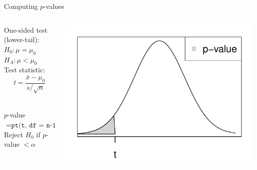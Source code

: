 \documentclass[fleqn, 10pt]{beamer}\usepackage[]{graphicx}\usepackage[]{color}
\begin{document}
\begin{frame}{Computing $p$-values}
\begin{columns}
\begin{column}{0.45\textwidth}
One-sided test (lower-tail):\\
$H_0: \mu = \mu_0$\\
$H_A: \mu < \mu_0$\\
\vspace{10pt}
Test statistic:\\
$$t = \frac{\bar{x} - \mu_0}{s/\sqrt{n}}$$\\
\vspace{10pt}

$p$-value $= \texttt{pt(t, df = n-1)}$\\ 
\vspace{10pt}
Reject $H_0$ if $p$-value $< \alpha$\\
\end{column}
\begin{column}{0.5\textwidth}
\includegraphics[scale=0.5]{figure/pvalue_lower.pdf}
\end{column}
\end{columns}
\vspace{1cm}
\end{frame}
\end{document}
